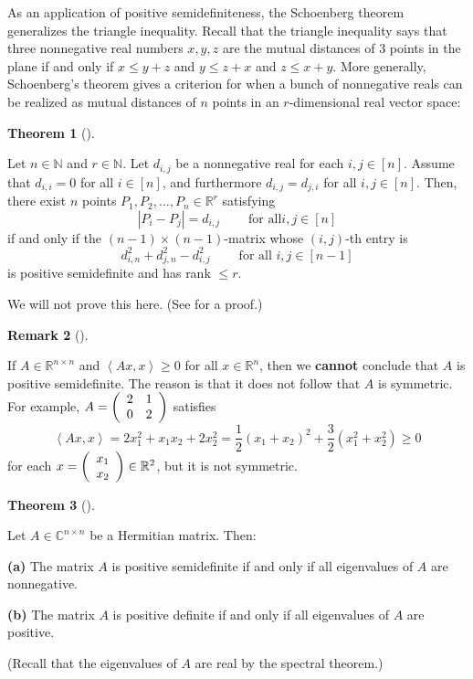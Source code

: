 \documentclass[numbers=enddot,12pt,final,onecolumn,notitlepage]{scrartcl}%
\numberwithin{exer}{subsection}
\theoremstyle{definition}
\newtheorem{theo}{Theorem}[subsection]
\newenvironment{theorem}[1][]
{\begin{theo}[#1]\begin{leftbar}}
{\end{leftbar}\end{theo}}
\newtheorem{remk}[theo]{Remark}
\newenvironment{remark}[1][]
{\begin{remk}[#1]\begin{leftbar}}
{\end{leftbar}\end{remk}}
\begin{document}
As an application of positive semidefiniteness, the Schoenberg theorem
generalizes the triangle inequality. Recall that the triangle inequality says
that three nonnegative real numbers $x,y,z$ are the mutual distances of $3$
points in the plane if and only if $x\leq y+z$ and $y\leq z+x$ and $z\leq
x+y$. More generally, Schoenberg's theorem gives a criterion for when a bunch
of nonnegative reals can be realized as mutual distances of $n$ points in an
$r$-dimensional real vector space:

\begin{theorem}
[Schoenberg's theorem]Let $n\in\mathbb{N}$ and $r\in\mathbb{N}$. Let $d_{i,j}$
be a nonnegative real for each $i,j\in\left[  n\right]  $. Assume that
$d_{i,i}=0$ for all $i\in\left[  n\right]  $, and furthermore $d_{i,j}%
=d_{j,i}$ for all $i,j\in\left[  n\right]  $. Then, there exist $n$ points
$P_{1},P_{2},\ldots,P_{n}\in\mathbb{R}^{r}$ satisfying%
\[
\left\vert P_{i}-P_{j}\right\vert =d_{i,j}\ \ \ \ \ \ \ \ \ \ \text{for all
}i,j\in\left[  n\right]
\]
if and only if the $\left(  n-1\right)  \times\left(  n-1\right)  $-matrix
whose $\left(  i,j\right)  $-th entry is
\[
d_{i,n}^{2}+d_{j,n}^{2}-d_{i,j}^{2}\ \ \ \ \ \ \ \ \ \ \text{for all }%
i,j\in\left[  n-1\right]
\]
is positive semidefinite and has rank $\leq r$.
\end{theorem}

We will not prove this here. (See \cite[Theorem 7.1]{LibLav15} for a proof.)

\begin{remark}
If $A\in\mathbb{R}^{n\times n}$ and $\left\langle Ax,x\right\rangle \geq0$ for
all $x\in\mathbb{R}^{n}$, then we \textbf{cannot} conclude that $A$ is
positive semidefinite. The reason is that it does not follow that $A$ is
symmetric. For example, $A=\left(
\begin{array}
[c]{cc}%
2 & 1\\
0 & 2
\end{array}
\right)  $ satisfies
\[
\left\langle Ax,x\right\rangle =2x_{1}^{2}+x_{1}x_{2}+2x_{2}^{2}=\dfrac{1}%
{2}\left(  x_{1}+x_{2}\right)  ^{2}+\dfrac{3}{2}\left(  x_{1}^{2}+x_{2}%
^{2}\right)  \geq0
\]
for each $x=\left(
\begin{array}
[c]{c}%
x_{1}\\
x_{2}%
\end{array}
\right)  \in\mathbb{R}^{2}$, but it is not symmetric.
\end{remark}

\begin{theorem}
\label{thm.herm.pos-semdef-using-evals}Let $A\in\mathbb{C}^{n\times n}$ be a
Hermitian matrix. Then: \medskip

\textbf{(a)} The matrix $A$ is positive semidefinite if and only if all
eigenvalues of $A$ are nonnegative. \medskip

\textbf{(b)} The matrix $A$ is positive definite if and only if all
eigenvalues of $A$ are positive. \medskip

(Recall that the eigenvalues of $A$ are real by the spectral theorem.)
\end{theorem}
\end{document}
